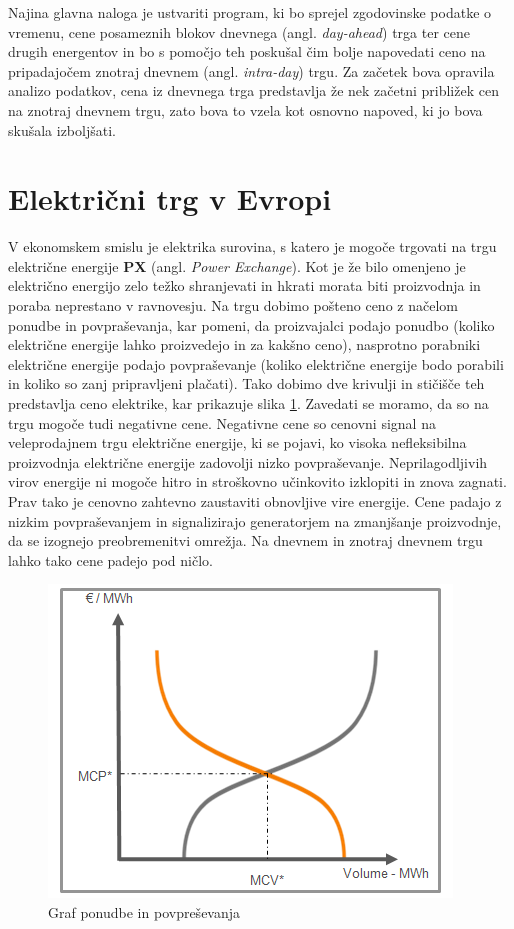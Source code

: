 \documentclass[12pt,a4paper]{amsart}
\theoremstyle{definition} %
\theoremstyle{plain} %
\begin{document}
Najina glavna naloga je ustvariti program, ki bo sprejel zgodovinske podatke o vremenu, cene posameznih
 blokov dnevnega (angl. \textit{day-ahead}) trga ter cene drugih energentov in bo s pomočjo teh poskušal čim bolje napovedati ceno na pripadajočem znotraj dnevnem (angl. \textit{intra-day}) trgu. 
 Za začetek bova opravila analizo podatkov, cena iz dnevnega trga predstavlja že nek začetni približek cen na znotraj dnevnem trgu, zato bova to vzela kot osnovno napoved, ki jo bova skušala izboljšati.



\section{Električni trg v Evropi}

V ekonomskem smislu je elektrika surovina, s katero je mogoče trgovati na trgu električne energije \textbf{PX} (angl. \textit{Power Exchange}). Kot je že bilo omenjeno je električno energijo zelo težko shranjevati in hkrati morata biti proizvodnja in poraba neprestano v ravnovesju.
 Na trgu dobimo pošteno ceno z načelom ponudbe in povpraševanja, kar pomeni, da proizvajalci podajo ponudbo (koliko električne energije lahko proizvedejo in za kakšno ceno), nasprotno porabniki električne energije podajo povpraševanje (koliko električne energije bodo porabili in koliko so zanj pripravljeni plačati). 
Tako dobimo dve krivulji in stičišče teh predstavlja ceno elektrike, kar prikazuje slika \ref{fig:postena_cena}. Zavedati se moramo, da so na trgu mogoče tudi negativne cene.
 Negativne cene so cenovni signal na veleprodajnem trgu električne energije, ki se pojavi, ko visoka nefleksibilna proizvodnja električne energije zadovolji nizko povpraševanje. Neprilagodljivih virov energije ni mogoče hitro in stroškovno učinkovito izklopiti in znova zagnati. Prav tako je cenovno zahtevno zaustaviti obnovljive vire energije.  
 Cene padajo z nizkim povpraševanjem in signalizirajo generatorjem na zmanjšanje proizvodnje, da se izognejo preobremenitvi omrežja. Na dnevnem in znotraj dnevnem trgu lahko tako cene padejo pod ničlo.

\begin{figure}[h]
    \centering
    \includegraphics[scale=0.75]{curve}
    \caption{Graf ponudbe in povpreševanja}
    \label{fig:postena_cena}
\end{figure}
\end{document}
